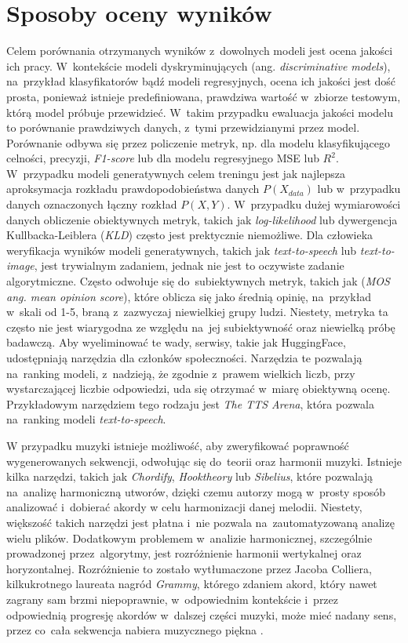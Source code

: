 \documentclass[data-science]{agh-wi} %
\begin{document}
\section{Sposoby oceny wyników}
Celem porównania otrzymanych wyników z~dowolnych modeli jest ocena jakości ich pracy. W~kontekście modeli dyskryminujących (ang. \textit{discriminative models}), na~przykład klasyfikatorów bądź modeli regresyjnych, ocena ich jakości jest dość prosta, ponieważ istnieje predefiniowana, prawdziwa wartość w~zbiorze testowym, którą model próbuje przewidzieć. W~takim przypadku ewaluacja jakości modelu to porównanie prawdziwych danych, z~tymi przewidzianymi przez model. Porównanie odbywa się przez policzenie metryk, np. dla modelu klasyfikującego celności, precyzji, \textit{F1-score} lub dla modelu regresyjnego MSE lub $R^2$. W~przypadku modeli generatywnych celem treningu jest jak najlepsza aproksymacja rozkładu prawdopodobieństwa danych $P(X_{data})$ lub w~przypadku danych oznaczonych łączny rozkład $P(X, Y)$. W~przypadku dużej wymiarowości danych obliczenie obiektywnych metryk, takich jak \textit{log-likelihood} lub dywergencja Kullbacka-Leiblera (\textit{KLD}) często jest prektycznie niemożliwe. Dla człowieka weryfikacja wyników modeli generatywnych, takich jak \textit{text-to-speech} lub \textit{text-to-image}, jest trywialnym zadaniem, jednak nie jest to oczywiste zadanie algorytmiczne. Często odwołuje się do~subiektywnych metryk, takich jak (\textit{MOS ang. mean opinion score}), które oblicza się jako średnią opinię, na~przykład w~skali od 1-5, braną z~zazwyczaj niewielkiej grupy ludzi. Niestety, metryka ta często nie jest wiarygodna ze względu na~jej subiektywność oraz niewielką próbę badawczą. Aby wyeliminować te wady, serwisy, takie jak HuggingFace, udostępniają narzędzia dla członków społeczności. Narzędzia te pozwalają na~ranking modeli, z~nadzieją, że zgodnie z~prawem wielkich liczb, przy wystarczającej liczbie odpowiedzi, uda się otrzymać w~miarę obiektywną ocenę. Przykładowym narzędziem tego rodzaju jest \textit{The TTS Arena}\cite{tts_arena}, która pozwala na~ranking modeli \textit{text-to-speech}.

W przypadku muzyki istnieje możliwość, aby zweryfikować poprawność wygenerowanych sekwencji, odwołując się do~teorii oraz harmonii muzyki. Istnieje kilka narzędzi, takich jak \textit{Chordify}, \textit{Hooktheory} lub \textit{Sibelius}, które pozwalają na~analizę harmoniczną utworów, dzięki czemu autorzy mogą w~prosty sposób analizować i~dobierać akordy w celu harmonizacji danej melodii. Niestety, większość takich narzędzi jest płatna i~nie pozwala na~zautomatyzowaną analizę wielu plików. Dodatkowym problemem w~analizie harmonicznej, szczególnie prowadzonej przez~algorytmy, jest rozróżnienie harmonii wertykalnej oraz horyzontalnej. Rozróżnienie to zostało wytłumaczone przez Jacoba Colliera, kilkukrotnego laureata nagród \textit{Grammy}, którego zdaniem akord, który nawet zagrany sam brzmi niepoprawnie, w~odpowiednim kontekście i~przez odpowiednią progresję akordów w~dalszej części muzyki, może mieć nadany sens, przez co~cała sekwencja nabiera muzycznego piękna \cite{collier_wrongnote}.
\end{document}
